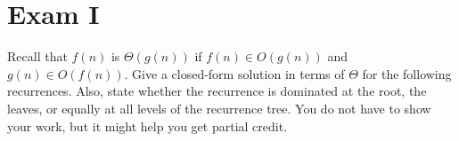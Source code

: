 \chapter{Exam I}

Recall that $f(n)$ is $\Theta(g(n))$
if $f(n) \in O(g(n))$ and $g(n) \in O(f(n))$.
Give a closed-form
solution in terms of $\Theta$ for the following recurrences.
Also, state whether the recurrence is dominated at the root, the
leaves, or equally at all levels of the recurrence tree.
You do not have to show your work, but it might help you get partial
credit.


